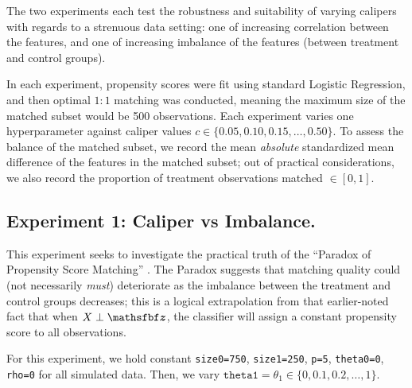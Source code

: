 \documentclass[11pt]{extarticle}
\begin{document}
The two experiments each test the robustness and suitability of varying calipers with regards to a strenuous data setting: one of increasing correlation between the features, and one of increasing imbalance of the features (between treatment and control groups).

In each experiment, propensity scores were fit using standard Logistic Regression, and then optimal $1:1$ matching was conducted, meaning the maximum size of the matched subset would be 500 observations. Each experiment varies one hyperparameter against caliper values $c \in \{0.05, 0.10, 0.15, \ldots, 0.50\}$. To assess the balance of the matched subset, we record the mean \emph{absolute} standardized mean difference of the features in the matched subset; out of practical considerations, we also record the proportion of treatment observations matched $\in [0, 1]$.

\subsection{Experiment 1: Caliper vs Imbalance.}
This experiment seeks to investigate the practical truth of the ``Paradox of Propensity Score Matching'' \parencite{king_why_2019}. The Paradox suggests that matching quality could (not necessarily \emph{must}) deteriorate as the imbalance between the treatment and control groups decreases; this is a logical extrapolation from that earlier-noted fact that when $\mat{X} \perp \vec{z}$, the classifier will assign a constant propensity score to all observations.

For this experiment, we hold constant \texttt{size0=750}, \texttt{size1=250}, \texttt{p=5}, \texttt{theta0=0}, \texttt{rho=0} for all simulated data.
Then, we vary $\texttt{theta1} = \theta_1 \in \{0, 0.1, 0.2, \ldots, 1\}$.
\end{document}
